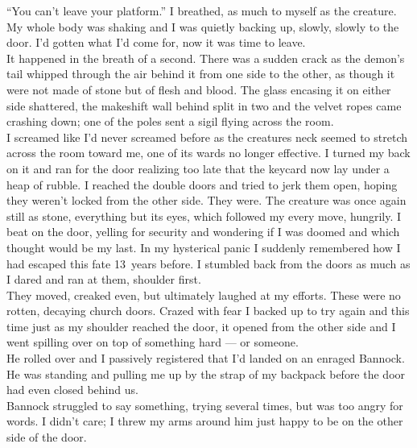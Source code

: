 \documentclass[a5paper]{scrartcl}
\begin{document}
\enquote{You can't leave your platform.} I breathed, as much to myself as the creature. My whole body was shaking and I was quietly backing up, slowly, slowly to the door. I'd gotten what I'd come for, now it was time to leave.\\


It happened in the breath of a second. There was a sudden crack as the demon's tail whipped through the air behind it from one side to the other, as though it were not made of stone but of flesh and blood. The glass encasing it on either side shattered, the makeshift wall behind split in two and the velvet ropes came crashing down; one of the poles sent a sigil flying across the room. \\





I screamed like I'd never screamed before as the creatures neck seemed to stretch across the room toward me, one of its wards no longer effective. I turned my back on it and ran for the door realizing too late that the keycard now lay under a heap of rubble. I reached the double doors and tried to jerk them open, hoping they weren't locked from the other side. They were.  The creature was once again still as stone, everything but its eyes, which followed my every move, hungrily.
I beat on the door, yelling for security and wondering if I was doomed and which thought would be my last. In my hysterical panic I suddenly remembered how I had escaped this fate 13~years before. I stumbled back from the doors as much as I dared and ran at them, shoulder first.\\


They moved, creaked even, but ultimately laughed at my efforts. These were no rotten, decaying church doors. Crazed with fear I backed up to try again and this time just as my shoulder reached the door, it opened from the other side and I went spilling over on top of something hard --- or someone. \\


He rolled over and I passively registered that I'd landed on an enraged Bannock. He was standing and pulling me up by the strap of my backpack before the door had even closed behind us.  \\


Bannock struggled to say something, trying several times, but was too angry for words. I didn't care; I threw my arms around him just happy to be on the other side of the door. \\
\end{document}
